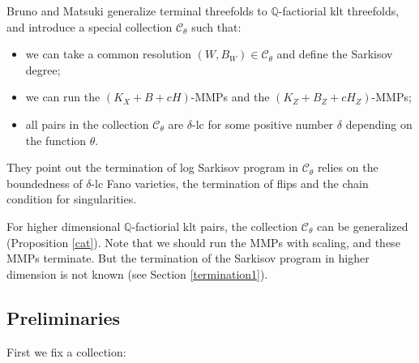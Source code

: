 \documentclass[11pt]{amsart}
\begin{document}
Bruno and Matsuki generalize terminal threefolds to $\mathbb{Q}$-factiorial klt threefolds,  and introduce a  special collection $\mathcal{C}_{\theta}$ such that: 
\begin{itemize}
    \item we can take a common resolution $(W,B_W)\in \mathcal{C}_\theta$ and define the Sarkisov degree;
    \item we can run the $(K_X+B+cH)$-MMPs and the $(K_Z+B_Z+cH_Z)$-MMPs;
    \item all pairs in  the collection $\mathcal{C}_{\theta}$ are $\delta$-lc for some positive number $\delta$ depending on the function $\theta$.
\end{itemize}
They point out the  termination of log Sarkisov program in $\mathcal{C}_{\theta}$ relies on the  boundedness of $\delta$-lc Fano varieties, the termination of flips and the chain condition for singularities. 

For higher dimensional $\mathbb{Q}$-factiorial klt pairs, the collection  $\mathcal{C}_\theta$ can be generalized (Proposition \ref{cat}). Note that we should run the MMPs with scaling, and these MMPs terminate. But the termination of the Sarkisov program in higher dimension is not known  (see Section \ref{termination1}).

\subsection{Preliminaries}

First we fix a collection: 
\end{document}
